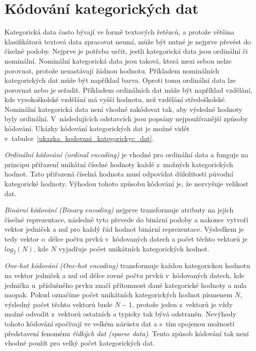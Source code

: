 \section{Kódování kategorických dat}
\label{kodovani_kategorickych_dat}
Kategorická data často bývají ve formě textových řetězců, a protože většina klasifikátorů textová data zpracovat neumí, může být nutné je nejprve převést do číselné podoby. Nejprve je potřeba určit, jestli kategorická data jsou ordinální či nominální. Nominální kategorická data jsou taková, která mezi sebou nelze porovnat, protože nezastávají žádnou hodnotu. Příkladem nominálních kategorických dat může být například barva. Oproti tomu ordinální data lze porovnat nebo je seřadit. Příkladem ordinálních dat může být například vzdělání, kde vysokoškolské vzdělání má vyšší hodnotu, než vzdělání středoškolské. Nominální kategorická data není vhodné zakódovat tak, aby výsledné hodnoty byly ordinální. V~následujících odstavcích jsou popsány nejpoužívanější způsoby kódování. Ukázky kódování kategorických dat je možné vidět v~tabulce~\ref{ukazka_kodovani_kategorickyc_dat}.\cite{cat_var_enc1}

\textit{Ordinální kódování (ordinal encoding)} je vhodné pro ordinální data a funguje na principu přiřazení unikátní číselné hodnoty každé z~možných kategorických hodnot. Tato přiřazená číselná hodnota musí odpovídat důležitosti původní kategorické hodnoty. Výhodou tohoto způsobu kódování je, že nezvyšuje velikost dat.\cite{cat_var_enc1}

\textit{Binární kódování (Binary encoding)} nejprve transformuje atributy na jejich číselné reprezentace, následně tyto převede do binární podoby a nakonec vytvoří vektor jedniček a nul pro každý řád hodnot binární reprezentace. Výsledkem je tedy vektor o~délce počtu prvků v~kódovaných datech a počet těchto vektorů je $log_2(N)$, kde $N$ vyjadřuje počet unikátních kategorických hodnot.\cite{cat_var_enc2}

\textit{One-hot kódování (One-hot encoding)} transformuje každou kategorickou hodnotu na vektor jedniček a nul od délce rovné počtu prvků v~kódovaných datech, kde jednička u~příslušného prvku značí přítomnost dané kategorické hodnoty a nula naopak. Pokud označíme počet unikátních kategorických hodnot písmenem $N$, výsledný počet těchto vektorů bude $N-1$, protože jeden z~vektorů je vždy možné odvodit z~vektorů ostatních a typicky tak bývá odstraněn. Nevýhody tohoto kódování spočívají ve velkém nárůstu dat a s~tím spojenou možností představení fenoménu \textit{řídkých dat (sparse data)}. Tento způsob kódování tak není vhodné použít pro velký počet kategorických dat.\cite{cat_var_enc1}\cite{cat_var_enc2}

